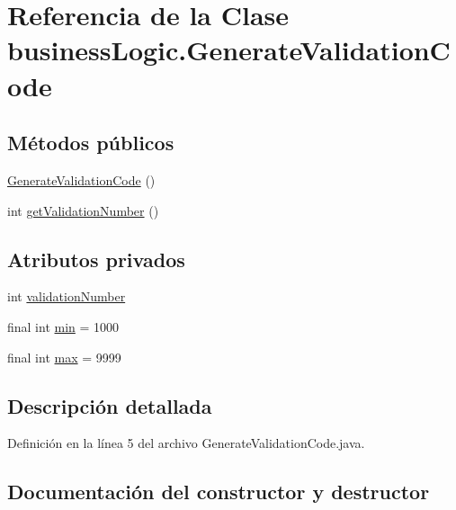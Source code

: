 \hypertarget{classbusiness_logic_1_1_generate_validation_code}{}\section{Referencia de la Clase business\+Logic.\+Generate\+Validation\+Code}
\label{classbusiness_logic_1_1_generate_validation_code}
\subsection*{Métodos públicos}
\begin{DoxyCompactItemize}
\item 
\mbox{\hyperlink{classbusiness_logic_1_1_generate_validation_code_a92bd48c1823c3ebc03405e05eb465f96}{Generate\+Validation\+Code}} ()
\item 
int \mbox{\hyperlink{classbusiness_logic_1_1_generate_validation_code_aaf6487d6c3a94c31333672635ae9cd28}{get\+Validation\+Number}} ()
\end{DoxyCompactItemize}
\subsection*{Atributos privados}
\begin{DoxyCompactItemize}
\item 
int \mbox{\hyperlink{classbusiness_logic_1_1_generate_validation_code_a070be2bda64238cec0f5951e03cadd07}{validation\+Number}}
\item 
final int \mbox{\hyperlink{classbusiness_logic_1_1_generate_validation_code_a06e827547295d178ab349104c2aa93fb}{min}} = 1000
\item 
final int \mbox{\hyperlink{classbusiness_logic_1_1_generate_validation_code_a1b44dd596967e6ea88216fb4f8474dd0}{max}} = 9999
\end{DoxyCompactItemize}


\subsection{Descripción detallada}


Definición en la línea 5 del archivo Generate\+Validation\+Code.\+java.



\subsection{Documentación del constructor y destructor}
\mbox{\label{classbusiness_logic_1_1_generate_validation_code_a92bd48c1823c3ebc03405e05eb465f96}} 
